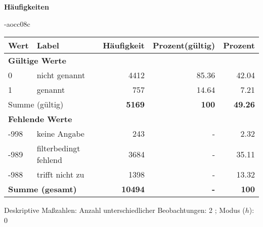         		\vspace*{0.5cm}
                \noindent\textbf{Häufigkeiten}

                \vspace*{-\baselineskip}
					\begin{filecontents}{\jobname-aocc08c}
					\begin{longtable}{lXrrr}
					\toprule
					\textbf{Wert} & \textbf{Label} & \textbf{Häufigkeit} & \textbf{Prozent(gültig)} & \textbf{Prozent} \\
					\endhead
					\midrule
					\multicolumn{5}{l}{\textbf{Gültige Werte}}\\

					0 &
					\multicolumn{1}{X}{ nicht genannt   } &


					  \num{4412} &
					  \num[round-mode=places,round-precision=2]{85.36} &
					    \num[round-mode=places,round-precision=2]{42.04} \\

					1 &
					\multicolumn{1}{X}{ genannt   } &


					  \num{757} &
					  \num[round-mode=places,round-precision=2]{14.64} &
					    \num[round-mode=places,round-precision=2]{7.21} \\
					\midrule
					\multicolumn{2}{l}{Summe (gültig)} &
					  \textbf{\num{5169}} &
					\textbf{\num{100}} &
					  \textbf{\num[round-mode=places,round-precision=2]{49.26}} \\
					\multicolumn{5}{l}{\textbf{Fehlende Werte}}\\
							-998 &
							keine Angabe &
							  \num{243} &
							 - &
							  \num[round-mode=places,round-precision=2]{2.32} \\
							-989 &
							filterbedingt fehlend &
							  \num{3684} &
							 - &
							  \num[round-mode=places,round-precision=2]{35.11} \\
							-988 &
							trifft nicht zu &
							  \num{1398} &
							 - &
							  \num[round-mode=places,round-precision=2]{13.32} \\
					\midrule
					\multicolumn{2}{l}{\textbf{Summe (gesamt)}} &
				      \textbf{\num{10494}} &
				    \textbf{-} &
				    \textbf{\num{100}} \\
					\bottomrule
					\end{longtable}
					\end{filecontents}
				\label{tableValues:aocc08c}
				\vspace*{-\baselineskip}
                    \begin{noten}
                	    \note{} Deskriptive Maßzahlen:
                	    Anzahl unterschiedlicher Beobachtungen: 2%
                	    ; 
                	      Modus ($h$): 0
                     \end{noten}

